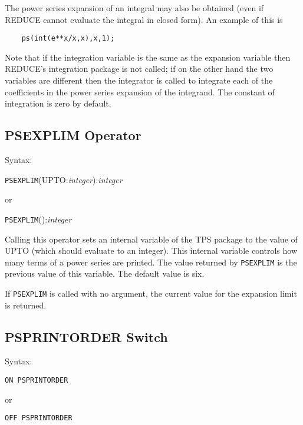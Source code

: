 The power series expansion of an integral may also be obtained (even if
REDUCE cannot evaluate the integral in closed form).  An example of
this is

\begin{verbatim}
    ps(int(e**x/x,x),x,1);
\end{verbatim}
 
Note that if the integration variable is the same as the expansion
variable then REDUCE's integration package is not called; if on the
other hand the two variables are different then the integrator is
called to integrate each of the coefficients in the power series
expansion of the integrand.  The constant of integration is zero by
default.   
 
\subsection{PSEXPLIM Operator}

Syntax:

\hspace*{2em} {\tt PSEXPLIM}(UPTO:{\em integer}):{\em integer}

\hspace*{4em} or

\hspace*{2em} {\tt PSEXPLIM}():{\em integer}

Calling this operator sets an internal variable of the
TPS package to the value of UPTO (which should evaluate to an integer).
This internal variable controls how many terms of a power series are printed.
The value returned by {\tt PSEXPLIM} is the previous value of this variable.
The default value is six.
 
If {\tt PSEXPLIM} is called with no argument, the current value for
the expansion limit is returned.
 
\subsection{PSPRINTORDER Switch}

Syntax:

\hspace*{2em} {\tt ON PSPRINTORDER}

\hspace*{4em} or

\hspace*{2em} {\tt OFF PSPRINTORDER}


